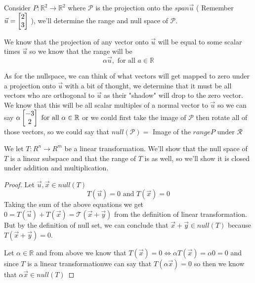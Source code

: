 \documentclass[11pt]{book}
\begin{document}
\begin{ex}
    Consider $P : \mathbb{R}^2 \to  \mathbb{R}^2$ where $\mathcal{P}$ is the
    projection onto the $\mathit{span} {\vec{u}} $ ( Remember $\vec{u} =
    \begin{bmatrix} 2 \\ 3 \end{bmatrix}$ ), we'll determine the range and null space of $\mathcal{P}$.
    
    We know that the projection of any vector onto $\vec{u}$ will be equal to
    some scalar times $\vec{u}$ so we know that the range will be 
    \begin{equation*}
        \alpha \vec{u}, \text{ for all } a \in \mathbb{R}
    \end{equation*}

    As for the nullspace, we can think of what vectors will get mapped to zero
    under a projection onto $\vec{u}$ with a bit of thought, we determine that
    it must be all vectors who are orthogonal to $\vec{u}$ as their "shadow"
    will drop to the zero vector. We know that this will be all scalar
    multiples of a normal vector to $\vec{u}$ so we can say $\alpha \begin{bmatrix} -3 \\
    2\end{bmatrix} \text{ for all } \alpha  \in \mathbb{R}$ or we could first take the image
    of $\mathcal{P}$ then rotate all of those vectors, so we could say that
    $\mathit{null} {\left( \mathcal{P} \right)} = $ Image of the $\mathit{range}
    {P} $ under $\mathcal{R}$ 
\end{ex}

\begin{eg}
    We let $T : R^{n} \to R^{m} $ be a linear transformation. We'll show that the
    null space of $T$ is a linear subspace and that the range of $T$ is as well, so
    we'll show it is closed under addition and multiplication.
\end{eg}

\begin{proof}
    Let $\vec{u}, \vec{x} \in \mathit{null} {\left( T \right)} $ 
    \begin{equation*}
        T\left(\vec{u}\right) = 0 \text{ and } T\left(\vec{x}\right) = 0
    \end{equation*}
    Taking the sum of the above equations we get $0 = T\left(\vec{u}\right) +
    T\left(\vec{x}\right) = \mathcal{T}\left(\vec{x} + \vec{y}\right)$ from the definition of linear transformation. But by the definition of null set, we can conclude that $\vec{x} + \vec{y} \in \mathit{null} {\left( T \right)} $ because $T\left(\vec{x} + \vec{y}\right) = 0$. 
    
    Let $\alpha \in \mathbb{R}$ and from above we know that $T\left(\vec{x}\right) = 0 \Leftrightarrow \alpha T\left(\vec{x}\right) = \alpha 0 = 0$ and since $T$ is a linear transformationwe can say that $T\left(\alpha \vec{x}\right) = 0$ so then we know that $\alpha \vec{x} \in \mathit{null} {\left( T \right)} $ 
\end{proof}
\end{document}

